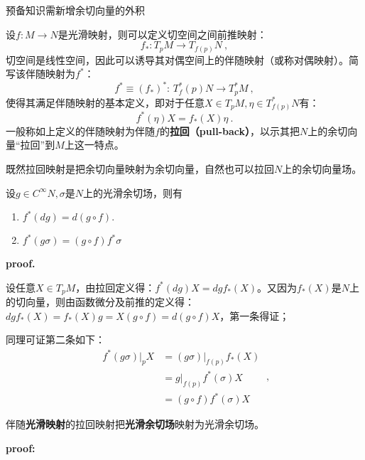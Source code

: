 
\begin{issues}
\issueDraft 预备知识需新增余切向量的外积
\end{issues}

设$f:M\rightarrow N$是光滑映射，则可以定义切空间之间前推映射：
\begin{equation}
f_*: T_p M\rightarrow T_{f(p)}N~,
\end{equation}
切空间是线性空间，因此可以诱导其对偶空间上的伴随映射（或称对偶映射）。简写该伴随映射为$f^*$：
\begin{equation}
f^*\equiv(f_*)^*:\,T^*_f(p)N\rightarrow T_p^*M~,
\end{equation}
使得其满足伴随映射的基本定义，即对于任意$X\in T_p M,\eta\in T^*_{f(p)}N$有：
\begin{equation}
f^*(\eta)X=f_*(X)\eta~.
\end{equation}
一般称如上定义的伴随映射为伴随$f$的\textbf{拉回（pull-back）}，以示其把$N$上的余切向量“拉回”到$M$上这一特点。

既然拉回映射是把余切向量映射为余切向量，自然也可以拉回$N$上的余切向量场。
\begin{lemma}{}\label{lem_PullBk_1}
设$g\in C^{\infty }N,\sigma$是$N$上的光滑余切场，则有
\begin{enumerate}
\item $f^*(dg)=d(g\circ f).$
\item $f^*(g\sigma)=(g\circ f)f^*\sigma$
\end{enumerate}
\end{lemma}
\textbf{proof.}

设任意$X\in T_pM$，由拉回定义得：$f^*(dg)X=dgf_*(X)$。又因为$f_*(X)$是$N$上的切向量，则由函数微分及前推的定义得：$dgf_*(X)=f_*(X)g=X(g\circ f)=d(g\circ f)X$，第一条得证；

同理可证第二条如下：
\begin{equation}
\begin{aligned}
f^*(g\sigma)|_pX&=(g\sigma)|_{f(p)}f_*(X)\\
&=g|_{f(p)}f^*(\sigma)X\\
&=(g\circ f)f^*(\sigma)X
\end{aligned}
~,
\end{equation}

\begin{theorem}{}
伴随\textbf{光滑映射}的拉回映射把\textbf{光滑余切场}映射为光滑余切场。
\end{theorem}
\textbf{proof:}

